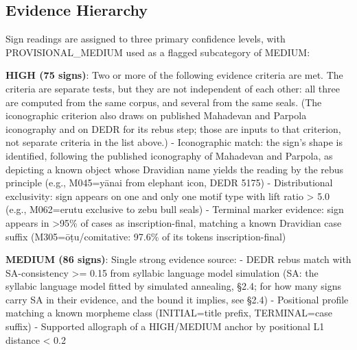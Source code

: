 \documentclass[11pt]{article}
\begin{document}
\subsection{Evidence Hierarchy}\label{evidence-hierarchy}

Sign readings are assigned to three primary confidence levels, with PROVISIONAL\_MEDIUM used as a flagged subcategory of MEDIUM:

\textbf{HIGH (75 signs)}: Two or more of the following evidence criteria are met. The criteria are separate tests, but they are not independent of each other: all three are computed from the same corpus, and several from the same seals. (The iconographic criterion also draws on published Mahadevan and Parpola iconography and on DEDR for its rebus step; those are inputs to that criterion, not separate criteria in the list above.) - Iconographic match: the sign's shape is identified, following the published iconography of Mahadevan and Parpola, as depicting a known object whose Dravidian name yields the reading by the rebus principle (e.g., M045=yānai from elephant icon, DEDR 5175) - Distributional
exclusivity: sign appears on one and only one motif type with lift ratio
\textgreater{} 5.0 (e.g., M062=erutu exclusive to zebu bull seals) -
Terminal marker evidence: sign appears in \textgreater95\% of cases as
inscription-final, matching a known Dravidian case suffix (M305=ōṭu/comitative: 97.6\% of its tokens inscription-final)

\textbf{MEDIUM (86 signs)}: Single strong evidence source: - DEDR rebus match with SA-consistency \textgreater{}= 0.15 from syllabic language model simulation (SA: the syllabic language model fitted by simulated annealing, §2.4; for how many signs carry SA in their evidence, and the bound it implies, see §2.4)
- Positional profile matching a known morpheme class (INITIAL=title
prefix, TERMINAL=case suffix) - Supported allograph of a HIGH/MEDIUM
anchor by positional L1 distance \textless{} 0.2
\end{document}
